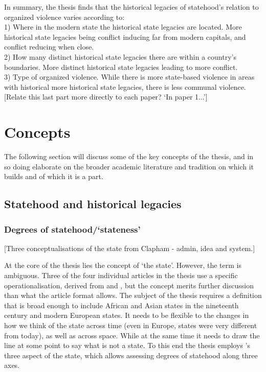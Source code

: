 \documentclass[12pt]{article}
\begin{document}
In summary, the thesis finds that the historical legacies of statehood's
relation to organized violence varies according to:\\

1) Where in the modern state the historical state legacies are located. More
historical state legacies being conflict inducing far from modern capitals, and
conflict reducing when close.\\

2) How many distinct historical state legacies there are within a country's 
boundaries. More distinct historical state legacies leading to more conflict.\\

3) Type of organized violence. While there is more state-based violence in areas
with historical more historical state legacies, there is less communal
violence.\\

[Relate this last part more directly to each paper? `In paper 1...']

\section{Concepts} \label{Concepts}

The following section will discuss some of the key concepts of the thesis, and in
so doing elaborate on the broader academic literature and tradition on which it
builds and of which it is a part.

\subsection{Statehood and historical legacies} \label{Statehood and historical legacies}

\subsubsection{Degrees of statehood/`stateness'} \label{Degrees of statehood} %


[Three conceptualisations of the state from Clapham - admin, idea and system.]

At the core of the thesis lies the concept of `the state'. However, the term is
ambiguous. Three of the four individual articles in the thesis use a specific
operationalisation, derived from \citet{Butcher2019} and \citet{Butcher2017},
but the concept merits further discussion than what the article format allows.
The subject of the thesis requires a definition that is broad enough to include
African and Asian states in the nineteenth century and modern European states.
It needs to be flexible to the changes in how we think of the state across time
(even in Europe, states were very different from today), as well as across
space. While at the same time it needs to draw the line at some point to say
what is not a state. To this end the thesis employs \citet{Clapham1996}'s three
aspect of the state, which allows assessing degrees of statehood along three
axes.
\end{document}
